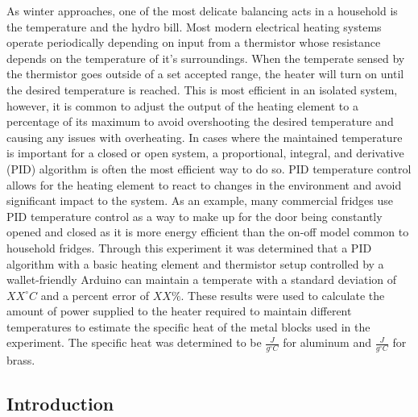 \documentclass[11pt]{article}
\begin{document}
    As winter approaches, one of the most delicate balancing acts in a
household is the temperature and the hydro bill. Most modern electrical
heating systems operate periodically depending on input from a
thermistor whose resistance depends on the temperature of it's
surroundings. When the temperate sensed by the thermistor goes outside
of a set accepted range, the heater will turn on until the desired
temperature is reached. This is most efficient in an isolated system,
however, it is common to adjust the output of the heating element to a
percentage of its maximum to avoid overshooting the desired temperature
and causing any issues with overheating. In cases where the maintained
temperature is important for a closed or open system, a proportional,
integral, and derivative (PID) algorithm is often the most efficient way
to do so. PID temperature control allows for the heating element to
react to changes in the environment and avoid significant impact to the
system. As an example, many commercial fridges use PID temperature
control as a way to make up for the door being constantly opened and
closed as it is more energy efficient than the on-off model common to
household fridges. Through this experiment it was determined that a PID
algorithm with a basic heating element and thermistor setup controlled
by a wallet-friendly Arduino can maintain a temperate with a standard
deviation of \(XX^{\circ }C\) and a percent error of \(XX\%\). These
results were used to calculate the amount of power supplied to the
heater required to maintain different temperatures to estimate the
specific heat of the metal blocks used in the experiment. The specific
heat was determined to be \(\frac{J}{g^{\circ}C}\) for aluminum and
\(\frac{J}{g^{\circ}C}\) for brass.

    \hypertarget{introduction}{%
\subsection{Introduction}\label{introduction}}
\end{document}

